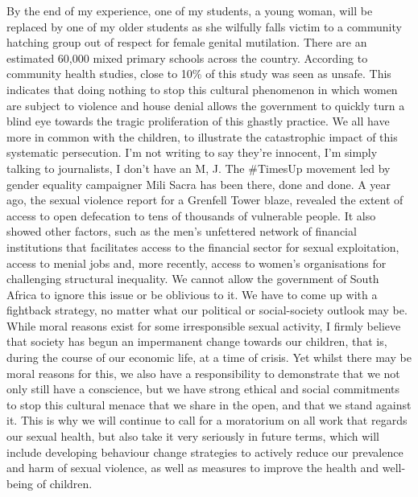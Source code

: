 \documentclass{article}%
\begin{document}
By the end of my experience, one of my students, a young woman, will be replaced by one of my older students as she wilfully falls victim to a community hatching group out of respect for female genital mutilation.\newline%
There are an estimated 60,000 mixed primary schools across the country. According to community health studies, close to 10\% of this study was seen as unsafe. This indicates that doing nothing to stop this cultural phenomenon in which women are subject to violence and house denial allows the government to quickly turn a blind eye towards the tragic proliferation of this ghastly practice.\newline%
We all have more in common with the children, to illustrate the catastrophic impact of this systematic persecution.\newline%
I’m not writing to say they’re innocent, I’m simply talking to journalists, I don’t have an M, J.\newline%
The \#TimesUp movement led by gender equality campaigner Mili Sacra has been there, done and done. A year ago, the sexual violence report for a Grenfell Tower blaze, revealed the extent of access to open defecation to tens of thousands of vulnerable people. It also showed other factors, such as the men’s unfettered network of financial institutions that facilitates access to the financial sector for sexual exploitation, access to menial jobs and, more recently, access to women’s organisations for challenging structural inequality.\newline%
We cannot allow the government of South Africa to ignore this issue or be oblivious to it. We have to come up with a fightback strategy, no matter what our political or social{-}society outlook may be.\newline%
While moral reasons exist for some irresponsible sexual activity, I firmly believe that society has begun an impermanent change towards our children, that is, during the course of our economic life, at a time of crisis. Yet whilst there may be moral reasons for this, we also have a responsibility to demonstrate that we not only still have a conscience, but we have strong ethical and social commitments to stop this cultural menace that we share in the open, and that we stand against it.\newline%
This is why we will continue to call for a moratorium on all work that regards our sexual health, but also take it very seriously in future terms, which will include developing behaviour change strategies to actively reduce our prevalence and harm of sexual violence, as well as measures to improve the health and well{-}being of children.\newline%
\end{document}
